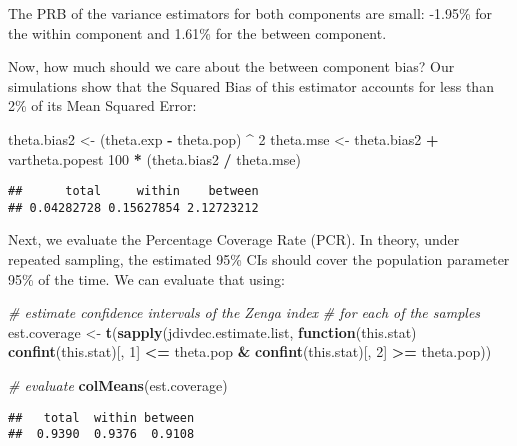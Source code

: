 \documentclass[
]{book}
\newenvironment{Shaded}{\begin{snugshade}}{\end{snugshade}}
\newcommand{\CommentTok}[1]{\textcolor[rgb]{0.56,0.35,0.01}{\textit{#1}}}
\newcommand{\ControlFlowTok}[1]{\textcolor[rgb]{0.13,0.29,0.53}{\textbf{#1}}}
\newcommand{\DecValTok}[1]{\textcolor[rgb]{0.00,0.00,0.81}{#1}}
\newcommand{\FunctionTok}[1]{\textcolor[rgb]{0.13,0.29,0.53}{\textbf{#1}}}
\newcommand{\NormalTok}[1]{#1}
\newcommand{\OtherTok}[1]{\textcolor[rgb]{0.56,0.35,0.01}{#1}}
\newcommand{\SpecialCharTok}[1]{\textcolor[rgb]{0.81,0.36,0.00}{\textbf{#1}}}
\begin{document}
The PRB of the variance estimators for both components are small: -1.95\% for the within component and 1.61\% for the between component.

Now, how much should we care about the between component bias? Our simulations show that the Squared Bias of this estimator accounts for less than 2\% of its Mean Squared Error:

\begin{Shaded}
\begin{Highlighting}[]
\NormalTok{theta.bias2 }\OtherTok{\textless{}{-}}\NormalTok{ (theta.exp }\SpecialCharTok{{-}}\NormalTok{ theta.pop) }\SpecialCharTok{\^{}} \DecValTok{2}
\NormalTok{theta.mse }\OtherTok{\textless{}{-}}\NormalTok{ theta.bias2 }\SpecialCharTok{+}\NormalTok{ vartheta.popest}
\DecValTok{100} \SpecialCharTok{*}\NormalTok{ (theta.bias2 }\SpecialCharTok{/}\NormalTok{ theta.mse)}
\end{Highlighting}
\end{Shaded}

\begin{verbatim}
##      total     within    between 
## 0.04282728 0.15627854 2.12723212
\end{verbatim}

Next, we evaluate the Percentage Coverage Rate (PCR). In theory, under repeated sampling, the estimated 95\% CIs should cover the population parameter 95\% of the time. We can evaluate that using:

\begin{Shaded}
\begin{Highlighting}[]
\CommentTok{\# estimate confidence intervals of the Zenga index}
\CommentTok{\# for each of the samples}
\NormalTok{est.coverage }\OtherTok{\textless{}{-}}
  \FunctionTok{t}\NormalTok{(}\FunctionTok{sapply}\NormalTok{(jdivdec.estimate.list, }\ControlFlowTok{function}\NormalTok{(this.stat)}
    \FunctionTok{confint}\NormalTok{(this.stat)[, }\DecValTok{1}\NormalTok{] }\SpecialCharTok{\textless{}=}\NormalTok{ theta.pop }\SpecialCharTok{\&}
      \FunctionTok{confint}\NormalTok{(this.stat)[, }\DecValTok{2}\NormalTok{] }\SpecialCharTok{\textgreater{}=}\NormalTok{ theta.pop))}

\CommentTok{\# evaluate}
\FunctionTok{colMeans}\NormalTok{(est.coverage)}
\end{Highlighting}
\end{Shaded}

\begin{verbatim}
##   total  within between 
##  0.9390  0.9376  0.9108
\end{verbatim}
\end{document}
